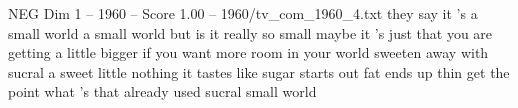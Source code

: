\begin{textsample}{NEG Dim 1 – 1960 – Score 1.00 – 1960/tv\_com\_1960\_4.txt}  \label{ex:f1_neg_074}
they say it 's a small world a small world but is it really so small maybe it 's just that you are getting a little bigger if you want more room in your world sweeten away with sucral a sweet little nothing it tastes like sugar starts out fat ends up thin get the point what 's that already used sucral small world

\end{textsample}
